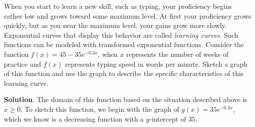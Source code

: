 \documentclass[10pt,]{book}
\theoremstyle{ptxdefinitionnotitle}
\theoremstyle{ptxdefinitiontitle}
\theoremstyle{ptxdefinitionnotitle}
\theoremstyle{ptxdefinitiontitle}
\theoremstyle{ptxdefinitionnotitle}
\theoremstyle{ptxdefinitiontitle}
\numberwithin{equation}{section}
\begin{document}
\begin{example}\label{example-18}
\hypertarget{p-245}{}%
When you start to learn a new skill, such as typing, your proficiency begins rather low and grows toward some maximum level.  At first your proficiency grows quickly, but as you near the maximum level, your gains grow more slowly.  Exponential curves that display this behavior are called \emph{learning curves}. Such functions can be modeled with transformed exponential functions. Consider the function \(f(x) = 45 - 35e^{-0.3x}\), when \(x\) represents the number of weeks of practice and \(f(x)\) represents typing speed in words per minute.  Sketch a graph of this function and use the graph to describe the specific characteristics of this learning curve.%
\par\smallskip%
\noindent\textbf{Solution}.\hypertarget{solution-18}{}\quad%
\hypertarget{p-246}{}%
The domain of this function based on the situation described above is \(x \geq 0\).  To sketch this function, we begin with the graph of \(g(x)= 35e^{-0.3x}\), which we know is a decreasing function with a \(y\)-intercept of \(35\).%
\begin{figure}
\centering
{
}
\end{figure}
\end{example}
\end{document}
